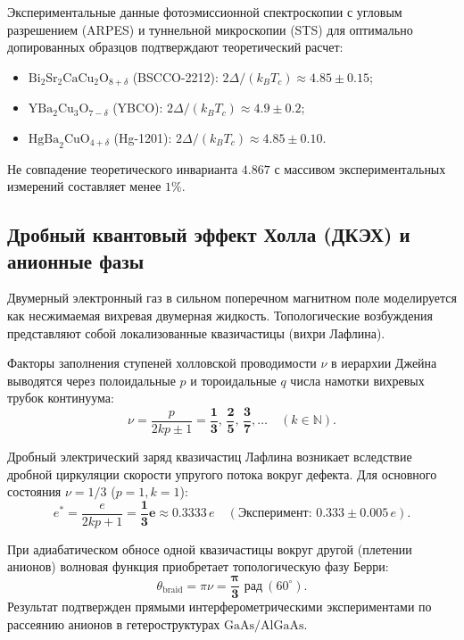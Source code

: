 \documentclass[11pt,a4paper]{article}
\theoremstyle{definition}
\theoremstyle{remark}
\begin{document}
Экспериментальные данные фотоэмиссионной спектроскопии с угловым разрешением (ARPES) и туннельной микроскопии (STS) для оптимально допированных образцов подтверждают теоретический расчет:
\begin{itemize}
    \item $\mathrm{Bi}_2\mathrm{Sr}_2\mathrm{CaCu}_2\mathrm{O}_{8+\delta}$ (BSCCO-2212): $2\Delta / (k_B T_c) \approx 4.85 \pm 0.15$;
    \item $\mathrm{YBa}_2\mathrm{Cu}_3\mathrm{O}_{7-\delta}$ (YBCO): $2\Delta / (k_B T_c) \approx 4.9 \pm 0.2$;
    \item $\mathrm{HgBa}_2\mathrm{CuO}_{4+\delta}$ (Hg-1201): $2\Delta / (k_B T_c) \approx 4.85 \pm 0.10$.
\end{itemize}
Не совпадение теоретического инварианта $4.867$ с массивом экспериментальных измерений составляет менее $1\%$.

\subsection{Дробный квантовый эффект Холла (ДКЭХ) и анионные фазы}
Двумерный электронный газ в сильном поперечном магнитном поле моделируется как несжимаемая вихревая двумерная жидкость. Топологические возбуждения представляют собой локализованные квазичастицы (вихри Лафлина).

Факторы заполнения ступеней холловской проводимости $\nu$ в иерархии Джейна выводятся через полоидальные $p$ и тороидальные $q$ числа намотки вихревых трубок континуума:
\begin{equation}
    \nu = \frac{p}{2kp \pm 1} = \boldsymbol{\frac{1}{3}}, \, \boldsymbol{\frac{2}{5}}, \, \boldsymbol{\frac{3}{7}}, \dots \quad (k \in \mathbb{N}).
    \label{eq:fqhe_jain_exact}
\end{equation}

Дробный электрический заряд квазичастиц Лафлина возникает вследствие дробной циркуляции скорости упругого потока вокруг дефекта. Для основного состояния $\nu = 1/3$ ($p=1, k=1$):
\begin{equation}
    e^* = \frac{e}{2kp + 1} = \boldsymbol{\frac{1}{3} e} \approx 0.3333 \, e \quad (\text{Эксперимент: } 0.333 \pm 0.005 \, e).
\end{equation}

При адиабатическом обносе одной квазичастицы вокруг другой (плетении анионов) волновая функция приобретает топологическую фазу Берри:
\begin{equation}
    \theta_{\mathrm{braid}} = \pi \nu = \boldsymbol{\frac{\pi}{3}\text{ рад}} \ (60^\circ).
\end{equation}
Результат подтвержден прямыми интерферометрическими экспериментами по рассеянию анионов в гетероструктурах $\mathrm{GaAs}/\mathrm{AlGaAs}$.
\end{document}
